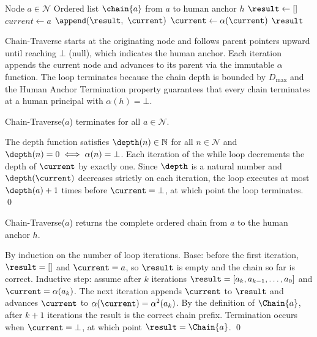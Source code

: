 \begin{algorithm}[H]
\caption{Chain-Traverse($a$)}
\label{alg:chain-traverse}
\begin{algorithmic}[1]
\REQUIRE Node $a \in \mathcal{N}$
\ENSURE Ordered list $\chain{a}$ from $a$ to human anchor $h$
\STATE $\result \leftarrow []$
\STATE $current \leftarrow a$
\WHILE{$\current \neq \bot$}
    \STATE $\append(\result,\ \current)$
    \STATE $\current \leftarrow \alpha(\current)$
\ENDWHILE
\RETURN $\result$
\end{algorithmic}
\end{algorithm}

Chain-Traverse starts at the originating node and follows parent pointers upward until reaching $\bot$ (null), which indicates the human anchor. Each iteration appends the current node and advances to its parent via the immutable $\alpha$ function. The loop terminates because the chain depth is bounded by $D_{\max}$ and the Human Anchor Termination property guarantees that every chain terminates at a human principal with $\alpha(h) = \bot$.

\begin{prop}[Termination]
\label{prop:chain-traverse-terminates}
Chain-Traverse($a$) terminates for all $a \in \mathcal{N}$.
\end{prop}
\begin{Proof}
The depth function satisfies $\depth(n) \in \mathbb{N}$ for all $n \in \mathcal{N}$ and $\depth(n) = 0 \iff \alpha(n) = \bot$. Each iteration of the while loop decrements the depth of $\current$ by exactly one. Since $\depth$ is a natural number and $\depth(\current)$ decreases strictly on each iteration, the loop executes at most $\depth(a) + 1$ times before $\current = \bot$, at which point the loop terminates. \qed
\end{Proof}

\begin{prop}[Correctness]
\label{prop:chain-traverse-correctness}
Chain-Traverse($a$) returns the complete ordered chain from $a$ to the human anchor $h$.
\end{prop}
\begin{Proof}
By induction on the number of loop iterations. Base: before the first iteration, $\result = []$ and $\current = a$, so $\result$ is empty and the chain so far is correct. Inductive step: assume after $k$ iterations $\result = [a_k, a_{k-1}, \ldots, a_0]$ and $\current = \alpha(a_k)$. The next iteration appends $\current$ to $\result$ and advances $\current$ to $\alpha(\current) = \alpha^2(a_k)$. By the definition of $\Chain{a}$, after $k+1$ iterations the result is the correct chain prefix. Termination occurs when $\current = \bot$, at which point $\result = \Chain{a}$. \qed
\end{Proof}

